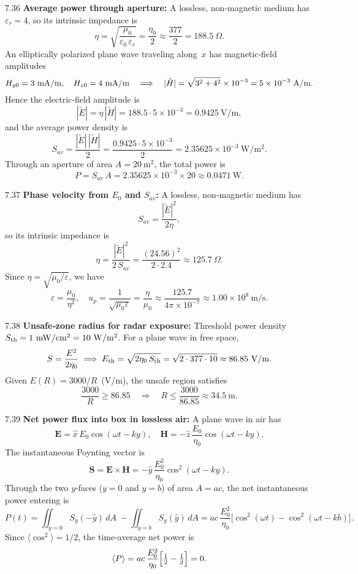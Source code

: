 \begin{chatbox}

\item[7.36] \textbf{Average power through aperture:}  
A lossless, non‐magnetic medium has $\varepsilon_r=4$, so its intrinsic impedance is  
\[
\eta=\sqrt{\frac{\mu_0}{\varepsilon_0\,\varepsilon_r}}
=\frac{\eta_0}{2}\approx\frac{377}{2}=188.5\ \Omega.
\]
An elliptically polarized plane wave traveling along~$x$ has magnetic‐field amplitudes  
\[
H_{y0}=3\ {\rm mA/m},\quad H_{z0}=4\ {\rm mA/m}
\quad\Longrightarrow\quad
|\tilde H|=\sqrt{3^2+4^2}\times10^{-3}=5\times10^{-3}\ \mathrm{A/m}.
\]
Hence the electric‐field amplitude is  
\[
|\tilde E|=\eta\,|\tilde H|=188.5\cdot5\times10^{-3}=0.9425\ \mathrm{V/m},
\]
and the average power density is  
\[
S_{av}
=\frac{|\tilde E|\,|\tilde H|}{2}
=\frac{0.9425\cdot5\times10^{-3}}{2}
=2.35625\times10^{-3}\ \mathrm{W/m^2}.
\]
Through an aperture of area $A=20\ \mathrm{m}^2$, the total power is  
\[
P=S_{av}\,A
=2.35625\times10^{-3}\times20
\approx0.0471\ \mathrm{W}.
\]

\item[7.37] \textbf{Phase velocity from $E_0$ and $S_{av}$:}  
A lossless, non‐magnetic medium has  
\[
S_{av}=\frac{|\tilde E|^2}{2\eta},  
\]
so its intrinsic impedance is  
\[
\eta=\frac{|\tilde E|^2}{2\,S_{av}}
=\frac{(24.56)^2}{2\cdot2.4}
\approx125.7\ \Omega.
\]
Since $\eta=\sqrt{\mu_0/\varepsilon}$, we have  
\[
\varepsilon=\frac{\mu_0}{\eta^2},
\quad
u_p=\frac1{\sqrt{\mu_0\varepsilon}}
=\frac{\eta}{\mu_0}
\approx\frac{125.7}{4\pi\times10^{-7}}
\approx1.00\times10^8\ \mathrm{m/s}.
\]

\item[7.38] \textbf{Unsafe‐zone radius for radar exposure:}  
Threshold power density $S_{\rm th}=1\ \mathrm{mW/cm^2}=10\ \mathrm{W/m^2}$.  
For a plane wave in free space,  
\[
S=\frac{E^2}{2\eta_0}
\;\Longrightarrow\;
E_{\rm th}=\sqrt{2\eta_0\,S_{\rm th}}
=\sqrt{2\cdot377\cdot10}
\approx86.85\ \mathrm{V/m}.
\]
Given $E(R)=3000/R\,$ (V/m), the unsafe region satisfies  
\[
\frac{3000}{R}\ge86.85
\quad\Longrightarrow\quad
R\le\frac{3000}{86.85}\approx34.5\ \mathrm{m}.
\]

\item[7.39] \textbf{Net power flux into box in lossless air:}  
A plane wave in air has  
\[
\mathbf E = \hat x\,E_0\cos(\omega t -k y),\quad
\mathbf H = -\hat z\,\frac{E_0}{\eta_0}\cos(\omega t -k y).
\]
The instantaneous Poynting vector is  
\[
\mathbf S
=\mathbf E\times\mathbf H
=-\hat y\,\frac{E_0^2}{\eta_0}\cos^2(\omega t -k y).
\]
Through the two $y$‐faces ($y=0$ and $y=b$) of area $A=ac$, the net instantaneous power entering is  
\[
P(t)
=\!\iint_{y=0}\!S_y(-\hat y)\,dA \;-\!\!\iint_{y=b}\!S_y(\hat y)\,dA
=ac\,\frac{E_0^2}{\eta_0}\bigl[\cos^2(\omega t)-\cos^2(\omega t -k b)\bigr].
\]
Since $\langle\cos^2\!\rangle=1/2$, the time‐average net power is  
\[
\langle P\rangle
=ac\,\frac{E_0^2}{\eta_0}\Bigl[\tfrac12-\tfrac12\Bigr]
=0.
\]


\end{chatbox}
